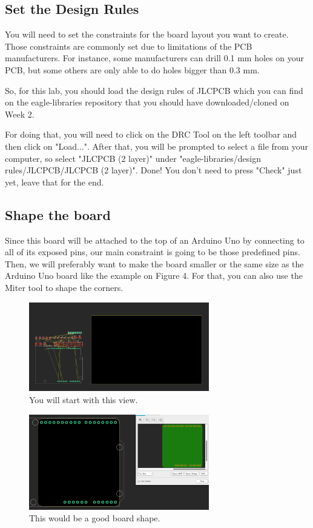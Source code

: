 \documentclass{article}
\begin{document}
\subsection{Set the Design Rules}
You will need to set the constraints for the board layout you want to create. Those constraints are commonly set due to limitations of the PCB manufacturers. For instance, some manufacturers can drill 0.1 mm holes on your PCB, but some others are only able to do holes bigger than 0.3 mm.

So, for this lab, you should load the design rules of JLCPCB which you can find on the eagle-libraries repository that you should have downloaded/cloned on Week 2.

For doing that, you will need to click on the DRC Tool on the left toolbar and then click on "Load...". After that, you will be prompted to select a file from your computer, so select "JLCPCB (2 layer)" under "eagle-libraries/design rules/JLCPCB/JLCPCB (2 layer)". Done! You don't need to press "Check" just yet, leave that for the end.
\pagebreak
\subsection{Shape the board}
Since this board will be attached to the top of an Arduino Uno by connecting to all of its exposed pins, our main constraint is going to be those predefined pins. Then, we will preferably want to make the board smaller or the same size as the Arduino Uno board like the example on Figure 4. For that, you can also use the Miter tool to shape the corners.

\begin{figure}[ht]
	\center
	\includegraphics[width=0.7\textwidth, keepaspectratio]{images/start.png}
	\caption{You will start with this view.}
	\label{fig:start}
\end{figure}

\begin{figure}[ht]
	\center
	\includegraphics[width=0.7\textwidth, keepaspectratio]{images/shaped.png}
	\caption{This would be a good board shape.}
	\label{fig:shaped}
\end{figure}
\end{document}
